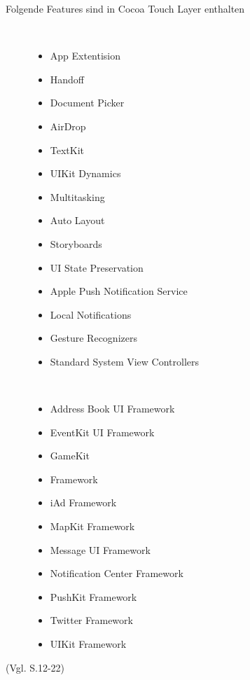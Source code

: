 \begin{description}
\item[Folgende Features sind in Cocoa Touch Layer enthalten]~\par
	\begin{multicols}{2}
	\begin{itemize}
		\item App Extentision
		\item Handoff
		\item Document Picker
		\item AirDrop
		\item TextKit
		\item UIKit Dynamics
		\item Multitasking
		\item Auto Layout
		\item Storyboards
		\item UI State Preservation
		\item Apple Push Notification Service
		\item Local Notifications
		\item Gesture Recognizers
		\item Standard System View Controllers
         \end{itemize}
	\end{multicols}
	
	 \item[\parbox{\textwidth} {Das Cocoa Touch Layer Framework beinhaltet folgende Frameworks}]~\par
	\begin{multicols}{2}
	\begin{itemize}
		\item Address Book UI Framework
		\item EventKit UI Framework
		\item GameKit
		\item  Framework
		\item iAd Framework
		\item MapKit Framework
		\item Message UI Framework
		\item Notification Center Framework
		\item PushKit Framework
		\item Twitter Framework
		\item UIKit Framework
         \end{itemize}
	\end{multicols}
\end{description}
(Vgl. \cite{Apple[6]} S.12-22)

